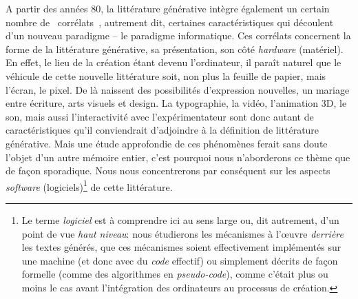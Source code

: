 \documentclass{article}
\begin{document}
			A partir des années 80, la littérature générative intègre également un certain nombre de \guillemotleft~corrélats~\guillemotright, autrement dit, certaines caractéristiques qui découlent d'un nouveau paradigme -- le paradigme informatique. Ces corrélats concernent la forme de la littérature générative, sa présentation, son côté \textit{hardware} (matériel). En effet, le lieu de la création étant devenu l'ordinateur, il paraît naturel que le véhicule de cette nouvelle littérature soit, non plus la feuille de papier, mais l'écran, le pixel. De là naissent des possibilités d'expression nouvelles, un mariage entre écriture, arts visuels et design. La typographie, la vidéo, l'animation 3D, le son, mais aussi l'interactivité avec l'expérimentateur sont donc autant de caractéristiques qu'il conviendrait d'adjoindre à la définition de littérature générative. Mais une étude approfondie de ces phénomènes ferait sans doute l'objet d'un autre mémoire entier, c'est pourquoi nous n'aborderons ce thème que de façon sporadique. Nous nous concentrerons par conséquent sur les aspects \textit{software} (logiciels)\footnote{Le terme \textit{logiciel} est à comprendre ici au sens large ou, dit autrement, d'un point de vue \textit{haut niveau}: nous étudierons les mécanismes à l'œuvre \textit{derrière} les textes générés, que ces mécanismes soient effectivement implémentés sur une machine (et donc avec du \textit{code} effectif) ou simplement décrits de façon formelle (comme des algorithmes en \textit{pseudo-code}), comme c'était plus ou moins le cas avant l'intégration des ordinateurs au processus de création.} de cette littérature.
		
\end{document}
